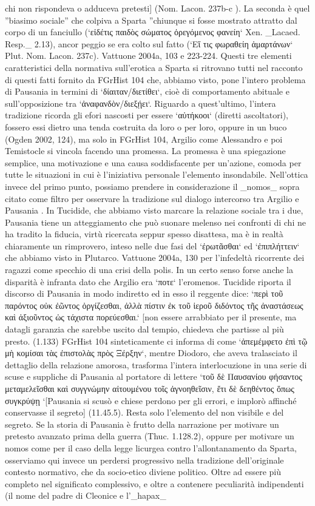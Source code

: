 chi non rispondeva o adduceva pretesti] (Nom. Lacon. 237b-c ). La seconda è quel ''biasimo sociale'' che colpiva a Sparta ''chiunque si fosse mostrato attratto dal corpo di un fanciullo (`εἰδέτις παιδὸς σώματος ὀρεγόμενος φανείη` Xen. _Lacaed. Resp._ 2.13), ancor peggio se era colto sul fatto (`Εἴ τις φωραθείη ἁμαρτάνων` Plut. Nom. Lacon. 237c). Vattuone 2004a, 103 e 223-224. Questi tre elementi caratteristici della normativa sull'erotica a Sparta si ritrovano tutti nel racconto di questi fatti fornito da FGrHist 104 che, abbiamo visto, pone l'intero problema di Pausania  in termini di `δίαιταν/διετίθει`, cioè di comportamento abituale e sull'opposizione tra `ἀναφανδὸν/διεξῄει`. Riguardo a quest'ultimo, l'intera tradizione ricorda gli efori nascosti per essere `αὐτήκοοι` (diretti ascoltatori), fossero essi dietro una tenda costruita da loro o per loro, oppure in un buco (Ogden 2002, 124), ma solo in FGrHist 104, Argilio  come Alessandro e poi Temistocle si vincola facendo una promessa. La promessa è una spiegazione semplice, una motivazione e una causa soddisfacente per un'azione, comoda per tutte le situazioni in cui è l'iniziativa personale l'elemento insondabile. Nell'ottica invece del primo punto, possiamo prendere in considerazione il _nomos_ sopra citato come filtro per osservare la tradizione sul dialogo intercorso tra Argilio  e Pausania . In Tucidide, che abbiamo visto marcare la relazione sociale tra i due, Pausania  tiene un atteggiamento che può suonare melenso nei confronti di chi ne ha tradito la fiducia, virtù ricercata seppur spesso disattesa, ma è in realtà chiaramente un rimprovero, inteso nelle due fasi del `ἐρωτᾶσθαι` ed `ἐπιπλήττειν` che abbiamo visto in Plutarco. Vattuone 2004a, 130 per l'infedeltà ricorrente dei ragazzi come specchio di una crisi della polis. In un certo senso forse anche la disparità è infranta dato che Argilio  era `ποτε` l'eromenos. Tucidide riporta il discorso di Pausania  in modo indiretto ed in esso il reggente dice: `περὶ τοῦ παρόντος οὐκ  ἐῶντος ὀργίζεσθαι, ἀλλὰ πίστιν ἐκ τοῦ ἱεροῦ διδόντος τῆς ἀναστάσεως καὶ ἀξιοῦντος ὡς τάχιστα πορεύεσθαι.` [non essere arrabbiato per il presente, ma datagli garanzia che  sarebbe uscito dal tempio, chiedeva che partisse al più presto. (1.133) FGrHist 104 sinteticamente ci informa di come `ἀπεμέμφετο ἐπὶ τῷ μὴ κομίσαι τὰς ἐπιστολὰς πρὸς Ξέρξην`, mentre Diodoro, che aveva tralasciato il dettaglio della relazione amorosa, trasforma l'intera interlocuzione in una serie di scuse e suppliche di Pausania  al portatore di lettere `τοῦ δὲ Παυσανίου φήσαντος μεταμελεῖσθαι καὶ συγγνώμην αἰτουμένου τοῖς ἀγνοηθεῖσιν, ἔτι δὲ δεηθέντος ὅπως συγκρύψῃ `[Pausania si scusò e chiese perdono per gli errori, e implorò affinché conservasse il segreto] (11.45.5). Resta solo l'elemento del non visibile e del segreto. Se la storia di Pausania  è frutto della narrazione per motivare un pretesto avanzato prima della guerra (Thuc. 1.128.2), oppure per motivare un nomos come per il caso della legge licurgea contro l'allontanamento da Sparta, osserviamo qui invece un perdersi progressivo nella tradizione dell'originale contesto normativo, che da socio-etico diviene politico. Oltre ad essere più completo nel significato complessivo, e oltre a contenere peculiarità indipendenti (il nome del padre di Cleonice e l'_hapax_ 